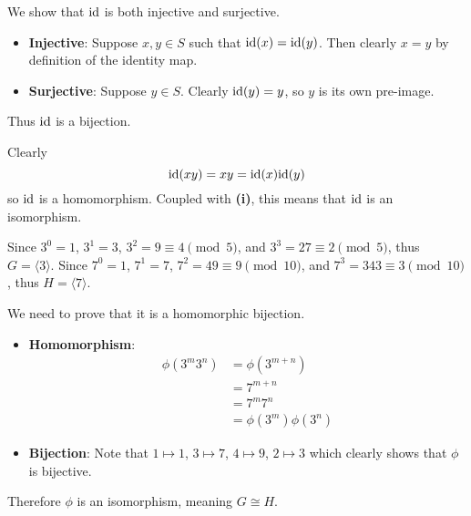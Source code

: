\begin{questions}
    \item \begin{partquestions}{\roman*}
        \item We show that $\mathrm{id}$ is both injective and surjective.
        \begin{itemize}
            \item \textbf{Injective}: Suppose $x, y \in S$ such that $\mathrm{id}(x) = \mathrm{id}(y)$. Then clearly $x = y$ by definition of the identity map.
            \item \textbf{Surjective}: Suppose $y \in S$. Clearly $\mathrm{id}(y) = y$, so $y$ is its own pre-image.
        \end{itemize}
        Thus $\mathrm{id}$ is a bijection.

        \item Clearly
        \[
            \mathrm{id}(xy) = xy = \mathrm{id}(x)\mathrm{id}(y)
        \]
        so $\mathrm{id}$ is a homomorphism. Coupled with \textbf{(i)}, this means that $\mathrm{id}$ is an isomorphism.
    \end{partquestions}

    \item \begin{partquestions}{\roman*}
        \item Since $3^0 = 1$, $3^1 = 3$, $3^2 = 9 \equiv 4 \pmod{5}$, and $3^3 = 27 \equiv 2 \pmod{5}$, thus $G = \langle 3 \rangle$. Since $7^0 = 1$, $7^1 = 7$, $7^2 = 49 \equiv 9 \pmod{10}$, and $7^3 = 343 \equiv 3 \pmod{10}$, thus $H = \langle 7 \rangle$.
        \item We need to prove that it is a homomorphic bijection.
        \begin{itemize}
            \item \textbf{Homomorphism}:
            \begin{align*}
                \phi(3^m3^n) &= \phi(3^{m+n})\\
                &= 7^{m+n}\\
                &= 7^m7^n\\
                &= \phi(3^m)\phi(3^n)
            \end{align*}

            \item \textbf{Bijection}: Note that $1 \mapsto 1$, $3 \mapsto 7$, $4 \mapsto 9$, $2 \mapsto 3$ which clearly shows that $\phi$ is bijective.
        \end{itemize}
        Therefore $\phi$ is an isomorphism, meaning $G \cong H$.
    \end{partquestions}


\end{questions}
